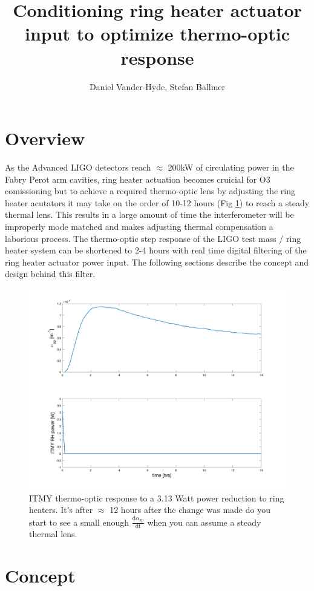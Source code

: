 \documentclass[colorlinks=true,pdfstartview=FitV,linkcolor=blue,
            citecolor=magenta,urlcolor=red]{ligodoc}
\title{Conditioning ring heater actuator input to optimize thermo-optic response}
\author{Daniel Vander-Hyde, Stefan Ballmer}
\begin{document}
\section{Overview}
\label{sec:I}
As the Advanced LIGO detectors reach $\approx$ 200kW of circulating power in the Fabry Perot arm cavities, ring heater actuation becomes cruicial for O3 comissioning but to achieve a required thermo-optic lens by adjusting the ring heater acutators it may take on the order of 10-12 hours (Fig \ref{fig:meas}) to reach a steady thermal lens. This results in a large amount of time the interferometer will be improperly mode matched and makes adjusting thermal compensation a laborious process. The thermo-optic step response of the LIGO test mass / ring heater system can be shortened to 2-4 hours with real time digital filtering of the ring heater actuator power input. The following sections describe the concept and design behind this filter.

\begin{figure}[H]
 \includegraphics[width=\textwidth]{figures/matlab/ITMY_RH_power_step_decrease_measure.png}
 \caption{ITMY thermo-optic response to a 3.13 Watt power reduction to ring heaters. It's after $\approx$ 12 hours after the change was made do you start to see a small enough $\frac{\mathrm{d} \alpha_\mathrm{sp}}{\mathrm{dt}}$ when you can assume a steady thermal lens.}
 \label{fig:meas}
\end{figure}
\section{Concept}
\label{sec:III}
\end{document}
